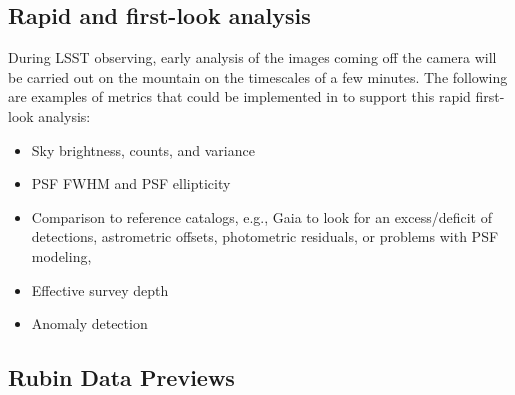 \subsection{Rapid and first-look analysis} \label{ssec:rapid}

During LSST observing, early analysis of the images coming off the camera will be carried out on the mountain on the timescales of a few minutes. 
The following are examples of metrics that could be implemented in \faro to support this rapid first-look analysis:
\begin{itemize}
\item Sky brightness, counts, and variance
\item PSF FWHM and PSF ellipticity
\item Comparison to reference catalogs, e.g., Gaia to look for an excess/deficit of detections, astrometric offsets, photometric residuals, or problems with PSF modeling,
\item Effective survey depth
\item Anomaly detection %
\end{itemize}

\subsection{Rubin Data Previews} \label{ssec:datapreviews}

